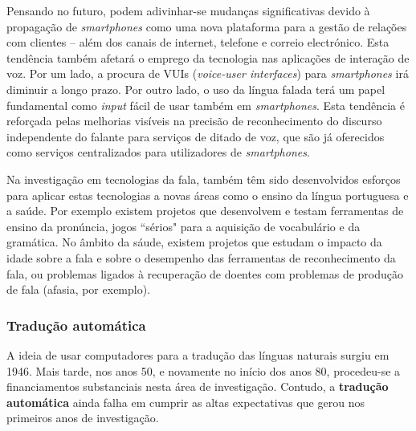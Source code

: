 \documentclass[]{../metanetpaper}
\begin{document}
\begin{multicols}{2}
Pensando no futuro, podem adivinhar-se mudanças significativas devido à propagação de \textit{smartphones} como uma nova plataforma para a gestão de relações com clientes – além dos canais de internet, telefone e correio electrónico. Esta tendência também afetará o emprego da tecnologia nas aplicações de interação de voz. Por um lado, a procura de VUIs (\textit{voice-user interfaces}) para \textit{smartphones} irá diminuir a longo prazo. Por outro lado, o uso da língua falada terá um papel fundamental como \textit{input} fácil de usar também em \textit{smartphones}. Esta tendência é reforçada pelas melhorias visíveis na precisão de reconhecimento do discurso independente do falante para serviços de ditado de voz, que são já oferecidos como serviços centralizados para utilizadores de \textit{smartphones}. 

Na investigação em tecnologias da fala, também têm sido desenvolvidos esforços para aplicar estas tecnologias a novas áreas como o ensino da língua portuguesa e a saúde. Por exemplo existem projetos que desenvolvem e testam ferramentas de ensino da pronúncia, jogos “sérios" para a aquisição de vocabulário e da gramática. No âmbito da sáude, existem projetos que estudam o impacto da idade sobre a fala e sobre o desempenho das ferramentas de reconhecimento da fala, ou problemas ligados à recuperação de doentes com problemas de produção de fala (afasia, por exemplo).

\subsubsection{Tradução automática}

 A ideia de usar computadores para a tradução das línguas naturais surgiu em 1946. Mais tarde, nos anos 50, e novamente no início dos anos 80, procedeu-se a financiamentos substanciais nesta área de investigação. Contudo, a \textbf{tradução automática} ainda falha em cumprir as altas expectativas que gerou nos primeiros anos de investigação.



\end{multicols}
\end{document}
